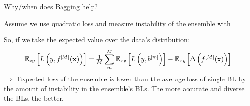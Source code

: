 \documentclass[11pt,compress,t,notes=noshow, xcolor=table]{beamer}
\begin{document}
\begin{vbframe}{Why/when does Bagging help?}



\small Assume we use quadratic loss and measure instability of the ensemble with
\vspace{-0.3cm}
So, if we take the expected value over the data's distribution:
$${\scriptsize \mathbb{E}_{xy}\left[L\left(y, f^{[M]}(\mathbf{x})\right)\right] = \tfrac{1}{M}\sum^M_{m} \mathbb{E}_{xy}\left[L\left(y, b^{[m]} \right)\right] - \mathbb{E}_{xy}\left[\Delta\left(f^{[M]}(\mathbf{x})\right)\right]}$$
$\Rightarrow$ Expected loss of the ensemble is lower than the average loss of single BL by the amount of instability in the ensemble's BLs. The more accurate and diverse the BLs, the better.
\normalsize
\framebreak
\end{vbframe}
\end{document}

